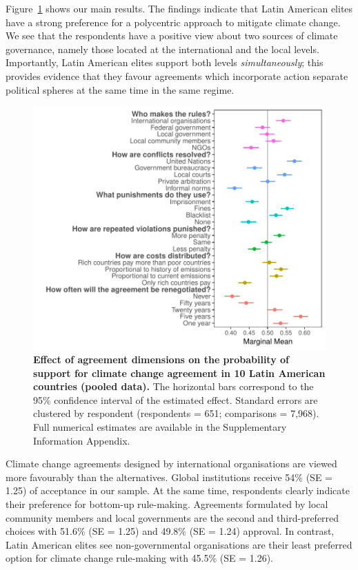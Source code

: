 \documentclass[a4paper,12pt]{article}
\begin{document}
Figure~\ref{fig:pooled} shows our main results. The findings indicate that Latin American elites have a strong preference for a polycentric approach to mitigate climate change. We see that the respondents have a positive view about two sources of climate governance, namely those located at the international and the local levels. Importantly, Latin American elites support both levels \textit{simultaneously}; this provides evidence that they favour agreements which incorporate action separate political spheres at the same time in the same regime. 

\begin{figure}[H]
	\centering
	\includegraphics[width=.9\linewidth]{pooled.pdf}
	\caption{\textbf{Effect of agreement dimensions on the probability of support for climate change agreement in 10 Latin American countries (pooled data).} The horizontal bars correspond to the 95\% confidence interval of the estimated effect. Standard errors are clustered by respondent (respondents = 651; comparisons = 7,968). Full numerical estimates are available in the Supplementary Information Appendix.}
	\label{fig:pooled}
\end{figure}

Climate change agreements designed by international organisations are viewed more favourably than the alternatives. Global institutions receive 54\% (SE = 1.25) of acceptance in our sample. At the same time, respondents clearly indicate their preference for bottom-up rule-making. Agreements formulated by local community members and local governments are the second and third-preferred choices with 51.6\% (SE = 1.25) and 49.8\% (SE = 1.24) approval. In contrast, Latin American elites see non-governmental organisations are their least preferred option for climate change rule-making with 45.5\% (SE = 1.26). 
\end{document}
